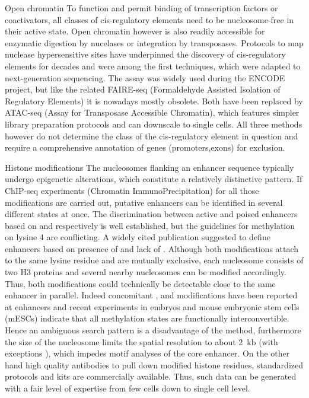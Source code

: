\begin{mydescription}{0.5cm}
	\item[Open chromatin] To function and permit binding of transcription factors or coactivators, all classes of cis-regulatory elements need to be nucleosome-free in their active state. Open chromatin however is also readily accessible for enzymatic digestion by nucelases or integration by transposases. Protocols to map nuclease hypersensitive sites\cite{Stewart1991} have underpinned the discovery of cis-regulatory elements for decades and were among the first techniques, which were adapted to next-generation sequencing\cite{Crawford2006}. The assay was widely used during the ENCODE project\cite{Thurman2012}, but like the related FAIRE-seq (Formaldehyde Assisted Isolation of Regulatory Elements)\cite{Giresi2007} it is nowadays mostly obsolete. Both have been replaced by ATAC-seq (Assay for Transposase Accessible Chromatin)\cite{Buenrostro2013}, which features simpler library preparation protocols and can downscale to single cells\cite{Buenrostro2015,Cusanovich2015}. All three methods however do not determine the class of the cis-regulatory element in question and require a comprehensive annotation of genes (promoters,exons) for exclusion. 
	\item[Histone modifications] The nucleosomes flanking an enhancer sequence typically undergo epigenetic alterations, which constitute a relatively distinctive pattern. If ChIP-seq experiments (Chromatin ImmunoPrecipitation)\cite{Barski2007,Johnson2007,Mikkelsen2007} for all those modifications are carried out, putative enhancers can be identified in several different states at once. The discrimination between active and poised enhancers based on \histwentysevenac and \histwentyseventhree respectively\cite{Zentner2011} is well established, but the guidelines for methylation on lysine 4 are conflicting. A widely cited publication suggested to define enhancers based on presence of \hisfourone and lack of \hisfourthree\cite{Heintzman2007}. Although both modifications attach to the same lysine residue and are mutually exclusive, each nucleosome consists of two H3 proteins and several nearby nucleosomes can be modified accordingly. Thus, both modifications could technically be detectable close to the same enhancer in parallel. Indeed concomitant \hisfourone, \hisfourtwo and \hisfourthree modifications have been reported at enhancers\cite{Pekowska2011,KochAndrau2011} and recent experiments in  embryos and mouse embryonic stem cells (mESCs) indicate that all methylation states are functionally interconvertible\cite{Rickels2017a}. Hence an ambiguous search pattern is a disadvantage of the method, furthermore the size of the nucleosome limits the spatial resolution to about \SI{2}{kb} (with exceptions \cite{Rhee2011}), which impedes motif analyses of the core enhancer. On the other hand high quality antibodies to pull down modified histone residues, standardized protocols and kits are commercially available. Thus, such data can be generated with a fair level of expertise from few cells \cite{Lara-Astiaso2014} down to single cell level\cite{Rotem2015}. 

\end{mydescription}
